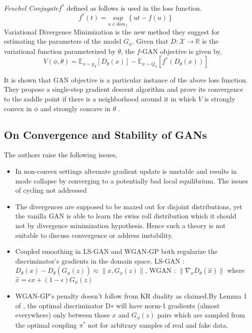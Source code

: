\noindent\textit{Fenchel Conjugate}$f^*$ defined as follows is used in the loss function.\\
 $$f^*(t) = \underset{u\in dom_{f}}{sup} \left \{ut - f(u) \right \}$$ 
Variational Divergence Minimization is the new method they suggest for estimating the parameters of the model $G_{\phi}$. Given that $D : \mathcal{X} \rightarrow \mathbb{R}$ is the variational function parameterized by $\theta$, the $f$-GAN objective is given by,
\begin{equation}\label{eq:5}
V(\phi, \theta) = \mathbb{E}_{x \sim p_d}[D_{\theta}(x)] - \mathbb{E}_{x \sim Q_{\phi}}[f^*(D_{\theta}(x))] 
\end{equation}
 

It is shown that GAN objective is a particular instance of the above loss function. They propose a single-step gradient descent algorithm and prove its convergence to the saddle point if there is a neighborhood around it in which $V$ is strongly convex in $\phi$ and strongly concave in $\theta$ .

\subsection*{On Convergence and Stability of GANs \citep{DRAGAN}}
The authors raise the following issues,
\begin{itemize}
\item In non-convex settings alternate gradient update is unstable and results in mode collapse by converging to a potentially bad local equilibrium. The issues of cycling not addressed
\item The divergences are supposed to be maxed out for disjoint distributions, yet the vanilla GAN is able to learn the swiss roll distribution which it should not by divergence minimization hypothesis. Hence such a theory is not suitable to discuss convergence or address instability.
\item Coupled smoothing in LS-GAN and WGAN-GP both regularize the discriminator's gradients in the domain space. LS-GAN : $D_{\theta}(x) - D_{\theta}(G_{\phi}(z)) \approx \parallel x, G_{\phi}(z) \parallel$, WGAN : $\parallel\nabla_{x}D_{\theta}(\hat{x}) \parallel$ where $\hat{x} = \epsilon x +(1-\epsilon )G_{\phi}(z) $  
\item WGAN-GP's penalty doesn't follow from KR duality as claimed.By Lemma 1 of \citep{gularajani}, the optimal discriminator D∗ will have norm-1 gradients (almost
everywhere) only between those $x$ and $ G_{\phi}(z)$ pairs which are sampled from the optimal coupling $\pi^*$ not for arbitrary samples of real and fake data.
\end{itemize}


